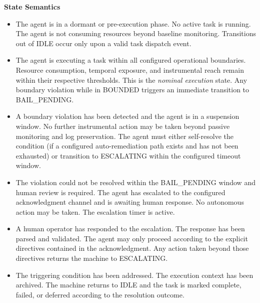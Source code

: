 \bigskip
\noindent\textbf{State Semantics}

\begin{itemize}
  \item[\textbf{IDLE}] The agent is in a dormant or pre-execution phase. No active task is running. The agent is not consuming resources beyond baseline monitoring. Transitions out of IDLE occur only upon a valid task dispatch event.

  \item[\textbf{BOUNDED}] The agent is executing a task within all configured operational boundaries. Resource consumption, temporal exposure, and instrumental reach remain within their respective thresholds. This is the \textit{nominal execution} state. Any boundary violation while in BOUNDED triggers an immediate transition to BAIL\_PENDING.

  \item[\textbf{BAIL\_PENDING}] A boundary violation has been detected and the agent is in a suspension window. No further instrumental action may be taken beyond passive monitoring and log preservation. The agent must either self-resolve the condition (if a configured auto-remediation path exists and has not been exhausted) or transition to ESCALATING within the configured timeout window.

  \item[\textbf{ESCALATING}] The violation could not be resolved within the BAIL\_PENDING window and human review is required. The agent has escalated to the configured acknowledgment channel and is awaiting human response. No autonomous action may be taken. The escalation timer is active.

  \item[\textbf{HUMAN\_ACKNOWLEDGED}] A human operator has responded to the escalation. The response has been parsed and validated. The agent may only proceed according to the explicit directives contained in the acknowledgment. Any action taken beyond those directives returns the machine to ESCALATING.

  \item[\textbf{RESOLVED}] The triggering condition has been addressed. The execution context has been archived. The machine returns to IDLE and the task is marked complete, failed, or deferred according to the resolution outcome.
\end{itemize}


